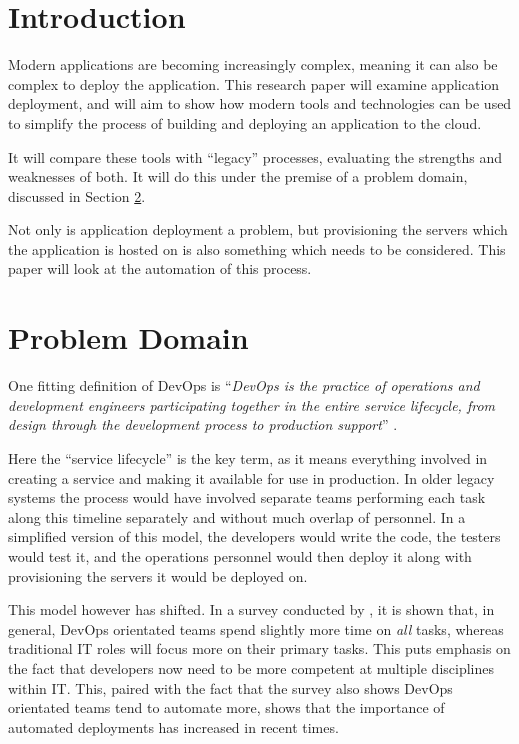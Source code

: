 \documentclass{article}
\author{Stephen Coady}
\begin{document}

\thispagestyle{empty}

\newpage
\tableofcontents
\newpage

\newpage
\section{Introduction} %
\label{sec:Introduction}
Modern applications are becoming increasingly complex, meaning it can also be complex to deploy the application. This research paper will examine application deployment, and will aim to show how modern tools and technologies can be used to simplify the process of building and deploying an application to the cloud. 

It will compare these tools with ``legacy'' processes, evaluating the strengths and weaknesses of both. It will do this under the premise of a problem domain, discussed in Section \ref{sec:Problem}.

Not only is application deployment a problem, but provisioning the servers which the application is hosted on is also something which needs to be considered. This paper will look at the automation of this process.

\section{Problem Domain}
\label{sec:Problem}

One fitting definition of DevOps is ``\textit{DevOps is the practice of operations and development engineers participating together in the entire service lifecycle, from design through the development process to production support}'' \citep{devops}.

Here the ``service lifecycle'' is the key term, as it means everything involved in creating a service and making it available for use in production. In older legacy systems the process would have involved separate teams performing each task along this timeline separately and without much overlap of personnel. In a simplified version of this model, the developers would write the code, the testers would test it, and the operations personnel would then deploy it along with provisioning the servers it would be deployed on.

This model however has shifted. In a survey conducted by \citep{survey}, it is shown that, in general, DevOps orientated teams spend slightly more time on \textit{all} tasks, whereas traditional IT roles will focus more on their primary tasks. This puts emphasis on the fact that developers now need to be more competent at multiple disciplines within IT. This, paired with the fact that the survey also shows DevOps orientated teams tend to automate more, shows that the importance of automated deployments has increased in recent times. 
\end{document}
